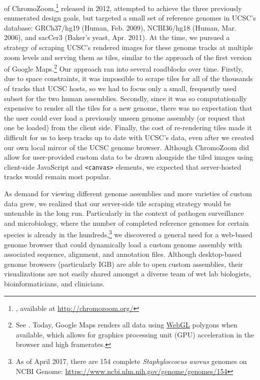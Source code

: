  of ChromoZoom,\footnote{\textcite{Pak2013a}, available at \url{http://chromozoom.org/}} released in 2012, attempted to achieve the three previously enumerated design goals, but targeted a small set of reference genomes in UCSC's database: GRCh37/hg19 (Human, Feb. 2009), NCBI36/hg18 (Human, Mar. 2006), and sacCer3 (Baker's yeast, Apr. 2011). At the time, we pursued a strategy of scraping UCSC's rendered images for these genome tracks at multiple zoom levels and serving them as tiles, similar to the approach of the first version of Google Maps.\footnote{See \textcite{Skinner2009}. Today, Google Maps renders all data using \href{https://developer.mozilla.org/en-US/docs/Web/API/WebGL_API}{WebGL} polygons when available, which allows for graphics processing unit (GPU) acceleration in the browser and high framerates.} Our approach ran into several roadblocks over time. Firstly, due to space constraints, it was impossible to scrape tiles for all of the thousands of tracks that UCSC hosts, so we had to focus only a small, frequently used subset for the two human assemblies. Secondly, since it was so computationally expensive to render all the tiles for a new genome, there was no expectation that the user could ever load a previously unseen genome assembly (or request that one be loaded) from the client side. Finally, the cost of re-rendering tiles made it difficult for us to keep tracks up to date with UCSC's data, even after we created our own local mirror of the UCSC genome browser. Although ChromoZoom did allow for user-provided custom data to be drawn alongside the tiled images using client-side JavaScript and \texttt{<canvas>} elements, we expected that server-hosted tracks would remain most popular.

As demand for viewing different genome assemblies and more varieties of custom data grew, we realized that our server-side tile scraping strategy would be untenable in the long run. Particularly in the context of pathogen surveillance and microbiology, where the number of completed reference genomes for certain species is already in the hundreds,\footnote{As of April 2017, there are 154 complete \emph{Staphyloccocus aureus} genomes on NCBI Genome: \url{https://www.ncbi.nlm.nih.gov/genome/genomes/154}} we discovered a general need for a web-based genome browser that could dynamically load a custom genome assembly with associated sequence, alignment, and annotation files. Although desktop-based genome browsers (particularly IGB) are able to open custom assemblies, their visualizations are not easily shared amongst a diverse team of wet lab biologists, bioinformaticians, and clinicians.

